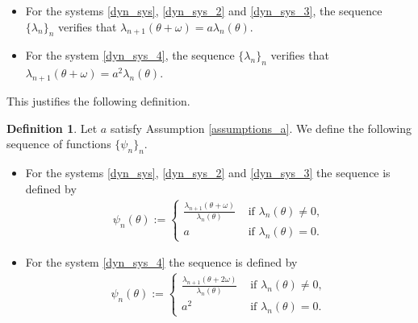 \documentclass[12pt]{article}
\theoremstyle{plain}
\theoremstyle{remark}
\theoremstyle{definition}
\newtheorem{definition}{Definition}[section]
\begin{document}
\begin{itemize}
    \item For the systems \eqref{dyn_sys}, \eqref{dyn_sys_2} and \eqref{dyn_sys_3}, the sequence $\{\lambda_n\}_n$ verifies that $\lambda_{n+1}(\theta+\omega)=a\lambda_n(\theta)$.
    \item For the system \eqref{dyn_sys_4}, the sequence $\{\lambda_n\}_n$ verifies that $\lambda_{n+1}(\theta+\omega)=a^2\lambda_n(\theta)$.
\end{itemize}
This justifies the following definition.
\begin{definition}\label{definition_psi}
    Let $a$ satisfy Assumption \eqref{assumptions_a}. We define the following sequence of functions $\{\psi_n\}_n$.
    \begin{itemize}
        \item For the systems \eqref{dyn_sys}, \eqref{dyn_sys_2} and \eqref{dyn_sys_3} the sequence is defined by
        \begin{align*}
            \psi_n(\theta):=
            \begin{cases}
                \frac{\lambda_{n+1}(\theta+\omega)}{\lambda_n(\theta)} &\text{ if }\lambda_n(\theta)\not=0,\\
                a &\text{ if }\lambda_n(\theta)=0.
            \end{cases}
        \end{align*}
        \item For the system \eqref{dyn_sys_4} the sequence is defined by
        \begin{align}\label{psi_def}
            \psi_n(\theta):=
            \begin{cases}
                \frac{\lambda_{n+1}(\theta+2\omega)}{\lambda_n(\theta)} &\text{ if }\lambda_n(\theta)\not=0,\\
                a^2 &\text{ if }\lambda_n(\theta)=0.
            \end{cases}
        \end{align}
    \end{itemize}
\end{definition}
\end{document}
